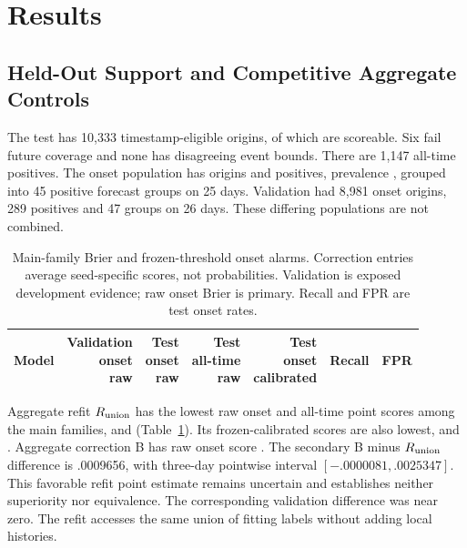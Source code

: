 \documentclass{llncs}
\begin{document}
\section{Results}
\subsection{Held-Out Support and Competitive Aggregate Controls}
The test has 10,333 timestamp-eligible origins, of which \TestEligible{} are scoreable. Six fail future coverage and none has disagreeing event bounds. There are 1,147 all-time positives. The onset population has \TestOnsetN{} origins and \TestPos{} positives, prevalence \TestPrevalence{}, grouped into 45 positive forecast groups on 25 days. Validation had 8,981 onset origins, 289 positives and 47 groups on 26 days. These differing populations are not combined.

\begin{table}[t]
\caption{Main-family Brier and frozen-threshold onset alarms. Correction entries average seed-specific scores, not probabilities. Validation is exposed development evidence; raw onset Brier is primary. Recall and FPR are test onset rates.}
\label{tab:scores}
\centering\small
\begin{tabular*}{\textwidth}{@{\extracolsep{\fill}}lrrrrrr}
\toprule
Model & \shortstack{Validation\\onset\\raw} & \shortstack{Test\\onset\\raw} & \shortstack{Test\\all-time\\raw} & \shortstack{Test\\onset\\calibrated} & Recall & FPR\\
\midrule

\bottomrule
\end{tabular*}
\end{table}

Aggregate refit $R_{\rm union}$ has the lowest raw onset and all-time point scores among the main families, \TestOnRUnion{} and \TestAllRUnion{} (Table~\ref{tab:scores}). Its frozen-calibrated scores are also lowest, \TestCalOnRUnion{} and \TestCalAllRUnion{}. Aggregate correction B has raw onset score \TestOnB{}. The secondary B minus $R_{\rm union}$ difference is .0009656, with three-day pointwise interval $[-.0000081,\allowbreak .0025347]$. This favorable refit point estimate remains uncertain and establishes neither superiority nor equivalence. The corresponding validation difference was near zero. The refit accesses the same union of fitting labels without adding local histories.
\end{document}
